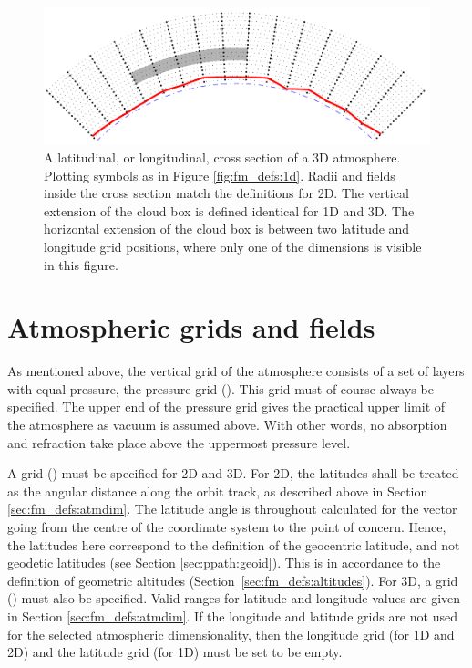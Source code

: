 \begin{figure}[p]
 \begin{center}
  \includegraphics*[width=0.98\hsize]{atm_dim_3dcross}
  \caption{A latitudinal, or longitudinal, cross section of a 3D atmosphere. 
    Plotting symbols as in Figure \ref{fig:fm_defs:1d}. Radii and
    fields inside the cross section match the definitions for 2D.
    The vertical extension
    of the cloud box is defined identical for 1D and 3D. The horizontal 
    extension of the cloud box is between two latitude and longitude grid
    positions, where only one of the dimensions is visible in this figure.}
  \label{fig:fm_defs:3dcross}
 \end{center}
\end{figure}



\section{Atmospheric grids and fields}
\label{sec:fm_defs:grids}

As mentioned above, the vertical grid of the atmosphere consists of a
set of layers with equal pressure, the pressure grid
().  This grid must of course always be specified.
The upper end of the pressure grid gives the practical upper limit of
the atmosphere as vacuum is assumed above. With other words, no
absorption and refraction take place above the uppermost pressure
level.

A  grid () must be specified for 2D and
3D. For 2D, the latitudes shall be treated as the angular distance along the
orbit track, as described above in Section \ref{sec:fm_defs:atmdim}. The
latitude angle is throughout calculated for the vector going from the centre of
the coordinate system to the point of concern. Hence, the latitudes here
correspond to the definition of the geocentric latitude, and not geodetic
latitudes (see Section \ref{sec:ppath:geoid}). This is in accordance to the
definition of geometric altitudes (Section~\ref{sec:fm_defs:altitudes}). For
3D, a  grid () must also be specified.
Valid ranges for latitude and longitude values are given in Section
\ref{sec:fm_defs:atmdim}. If the longitude and latitude grids are not used for
the selected atmospheric dimensionality, then the longitude grid (for 1D and
2D) and the latitude grid (for 1D) must be set to be empty.


